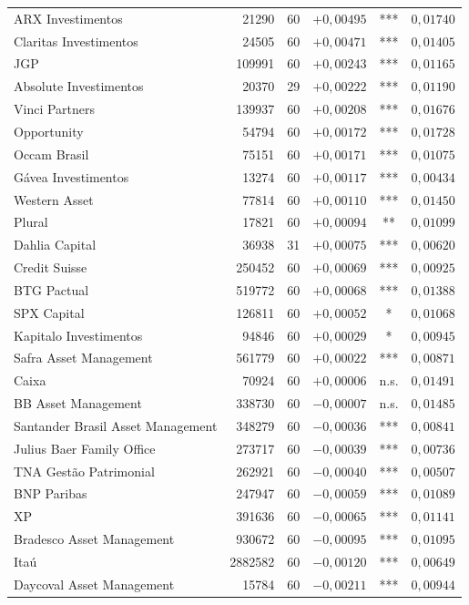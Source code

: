 \documentclass[11pt,a4paper]{article}
\begin{document}
\begin{center}
\begin{longtable}{@{}lrrrc r@{}}
ARX Investimentos & 21290 & 60 & $+0{,}00495$ & *** & $0{,}01740$ \\
Claritas Investimentos & 24505 & 60 & $+0{,}00471$ & *** & $0{,}01405$ \\
JGP & 109991 & 60 & $+0{,}00243$ & *** & $0{,}01165$ \\
Absolute Investimentos & 20370 & 29 & $+0{,}00222$ & *** & $0{,}01190$ \\
Vinci Partners & 139937 & 60 & $+0{,}00208$ & *** & $0{,}01676$ \\
Opportunity & 54794 & 60 & $+0{,}00172$ & *** & $0{,}01728$ \\
Occam Brasil & 75151 & 60 & $+0{,}00171$ & *** & $0{,}01075$ \\
Gávea Investimentos & 13274 & 60 & $+0{,}00117$ & *** & $0{,}00434$ \\
Western Asset & 77814 & 60 & $+0{,}00110$ & *** & $0{,}01450$ \\
Plural & 17821 & 60 & $+0{,}00094$ & ** & $0{,}01099$ \\
Dahlia Capital & 36938 & 31 & $+0{,}00075$ & *** & $0{,}00620$ \\
Credit Suisse & 250452 & 60 & $+0{,}00069$ & *** & $0{,}00925$ \\
BTG Pactual & 519772 & 60 & $+0{,}00068$ & *** & $0{,}01388$ \\
SPX Capital & 126811 & 60 & $+0{,}00052$ & * & $0{,}01068$ \\
Kapitalo Investimentos & 94846 & 60 & $+0{,}00029$ & * & $0{,}00945$ \\
Safra Asset Management & 561779 & 60 & $+0{,}00022$ & *** & $0{,}00871$ \\
Caixa & 70924 & 60 & $+0{,}00006$ & n.s. & $0{,}01491$ \\
BB Asset Management & 338730 & 60 & $-0{,}00007$ & n.s. & $0{,}01485$ \\
Santander Brasil Asset Management & 348279 & 60 & $-0{,}00036$ & *** & $0{,}00841$ \\
Julius Baer Family Office & 273717 & 60 & $-0{,}00039$ & *** & $0{,}00736$ \\
TNA Gestão Patrimonial & 262921 & 60 & $-0{,}00040$ & *** & $0{,}00507$ \\
BNP Paribas & 247947 & 60 & $-0{,}00059$ & *** & $0{,}01089$ \\
XP & 391636 & 60 & $-0{,}00065$ & *** & $0{,}01141$ \\
Bradesco Asset Management & 930672 & 60 & $-0{,}00095$ & *** & $0{,}01095$ \\
Itaú & 2882582 & 60 & $-0{,}00120$ & *** & $0{,}00649$ \\
Daycoval Asset Management & 15784 & 60 & $-0{,}00211$ & *** & $0{,}00944$ \\
\end{longtable}
\end{center}
\end{document}
